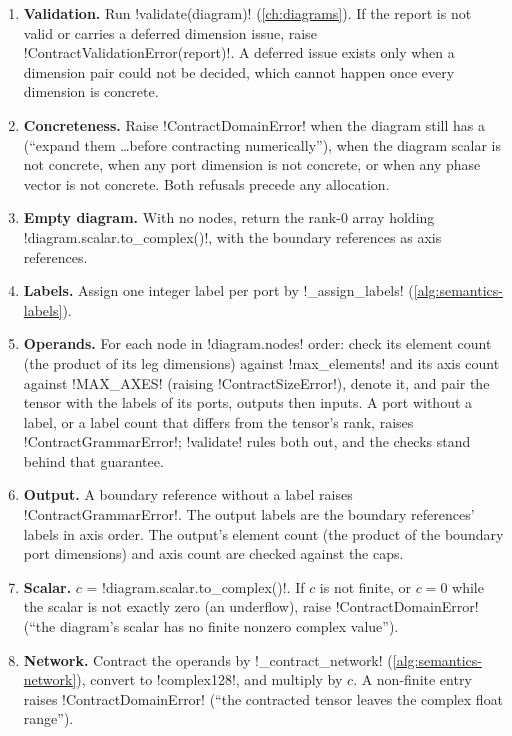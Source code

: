\begin{algorithm}\label{alg:semantics-contract}
\begin{enumerate}
\item \textbf{Validation.} Run \py!validate(diagram)! (\cref{ch:diagrams}). If the report is not valid or carries a deferred dimension issue, raise \py!ContractValidationError(report)!. A deferred issue exists only when a dimension pair could not be decided, which cannot happen once every dimension is concrete.
\item \textbf{Concreteness.} Raise \py!ContractDomainError! when the diagram still has a \bbox{} (``expand them \ldots before contracting numerically''), when the diagram scalar is not concrete, when any port dimension is not concrete, or when any phase vector is not concrete. Both refusals precede any allocation.
\item \textbf{Empty diagram.} With no nodes, return the rank-0 array holding \py!diagram.scalar.to_complex()!, with the boundary references as axis references.
\item \textbf{Labels.} Assign one integer label per port by \py!_assign_labels! (\cref{alg:semantics-labels}).
\item \textbf{Operands.} For each node in \py!diagram.nodes! order: check its element count (the product of its leg dimensions) against \py!max_elements! and its axis count against \py!MAX_AXES! (raising \py!ContractSizeError!), denote it, and pair the tensor with the labels of its ports, outputs then inputs. A port without a label, or a label count that differs from the tensor's rank, raises \py!ContractGrammarError!; \py!validate! rules both out, and the checks stand behind that guarantee.
\item \textbf{Output.} A boundary reference without a label raises \py!ContractGrammarError!. The output labels are the boundary references' labels in axis order. The output's element count (the product of the boundary port dimensions) and axis count are checked against the caps.
\item \textbf{Scalar.} $c$ = \py!diagram.scalar.to_complex()!. If $c$ is not finite, or $c=0$ while the scalar is not exactly zero (an underflow), raise \py!ContractDomainError! (``the diagram's scalar has no finite nonzero complex value'').
\item \textbf{Network.} Contract the operands by \py!_contract_network! (\cref{alg:semantics-network}), convert to \py!complex128!, and multiply by $c$. A non-finite entry raises \py!ContractDomainError! (``the contracted tensor leaves the complex float range'').
\end{enumerate}
\end{algorithm}

